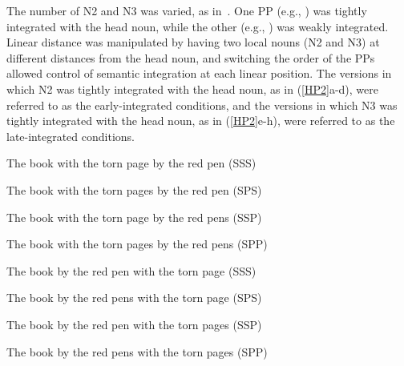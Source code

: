 \documentclass[12pt,titlepage]{article}
\newcommand{\IGNORE}[1]{} %
\begin{document}
The number of N2 and N3 was varied, as in~.  One PP (e.g., ) was tightly integrated with the head noun, while
the other (e.g., ) was weakly
integrated. Linear distance was manipulated by having two local nouns (N2 and N3) at different distances from the head noun, and switching the order of the PPs allowed control of semantic integration at each linear position. The versions in which N2 was tightly integrated with the head noun, as in (\ref{HP2}a-d), were referred to as the early-integrated conditions, and the versions in which N3 was tightly integrated with the head noun, as in  (\ref{HP2}e-h), were referred to as the late-integrated conditions. \IGNORE{The stimuli
equated hierarchical distance between the head noun (and thus also the
verb) and each of the two local nouns by ensuring that both PPs modified
the head.}

\begin{myexample}
\label{HP2}
\begin{examples}
    
    \item \label{HP2-early-sss} The book with the torn page by the red
    pen \hfill (SSS)\hspace{10em}
    
    \item \label{HP2-early-sps} The book with the torn pages by the 
    red pen \hfill (SPS)\hspace{10em}

    \item \label{HP2-early-ssp} The book with the torn page by the red
    pens \hfill (SSP)\hspace{10em}
    
    \item \label{HP2-early-spp} The book with the torn pages by the red
    pens \hfill (SPP)\hspace{10em}
    
    \item \label{HP2-late-sss} The book by the red pen with the torn
    page \hfill (SSS)\hspace{10em}

    \item \label{HP2-late-sps} The book by the red pens with the torn 
    page \hfill (SPS)\hspace{10em}

    \item \label{HP2-late-ssp} The book by the red pen with the torn 
    pages \hfill (SSP)\hspace{10em}

    \item \label{HP2-late-spp} The book by the red pens with the torn 
    pages \hfill (SPP)\hspace{10em}
    
\end{examples}
\end{myexample}
\end{document}
